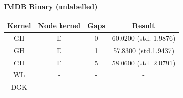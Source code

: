 \documentclass{article}
\begin{document}
\textbf{IMDB Binary (unlabelled)}\\
\begin{minipage}{0.6\linewidth}
	\hspace*{-1in}

	\label{fig:imdb_unlabelled}
\end{minipage}
\begin{minipage}[c]{0.5\linewidth}	
	\centering
	\begin{tabular}{c|c|c|c}
		Kernel & Node kernel & Gaps & Result\\
		\hline
		GH & D & 0 & 60.0200 (std. 1.9876)\\
		GH & D & 1 & 57.8300 (std.1.9437)\\
		GH & D & 5 & 58.0600 (std. 2.0791)\\
		WL & - & - & - \\
		DGK & - & - & \\
	\end{tabular}
	\label{table:imdb_unlabelled}
\end{minipage}
\end{document}
